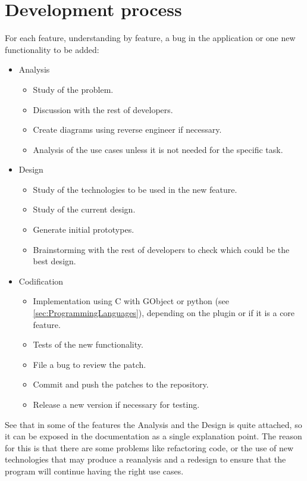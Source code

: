 
\chapter{Development process}


For each feature, understanding by feature, a bug in the application or one new functionality to be added:

\begin{itemize}
  \item Analysis
    \begin{itemize}
      \item Study of the problem.
      \item Discussion with the rest of developers.
      \item Create diagrams using reverse engineer if necessary.
      \item Analysis of the use cases unless it is not needed for the specific task.
    \end{itemize}
  \item Design
    \begin{itemize}
      \item Study of the technologies to be used in the new feature.
      \item Study of the current design.
      \item Generate initial prototypes.
      \item Brainstorming with the rest of developers to check which could be the best design.
    \end{itemize}
  \item Codification
    \begin{itemize}
      \item Implementation using C with GObject or python (see \ref{sec:ProgrammingLanguages}), depending on the plugin or if it is a core feature.
      \item Tests of the new functionality.
      \item File a bug to review the patch.
      \item Commit and push the patches to the \GNOME repository.
      \item Release a new version if necessary for testing.
    \end{itemize}
\end{itemize}

\newpage
See that in some of the features the Analysis and the Design is quite attached, so it can be exposed in the documentation as a single explanation point. The reason for this is that there are some problems like refactoring code, or the use of new technologies that may produce a reanalysis and a redesign to ensure that the program will continue having the right use cases.
